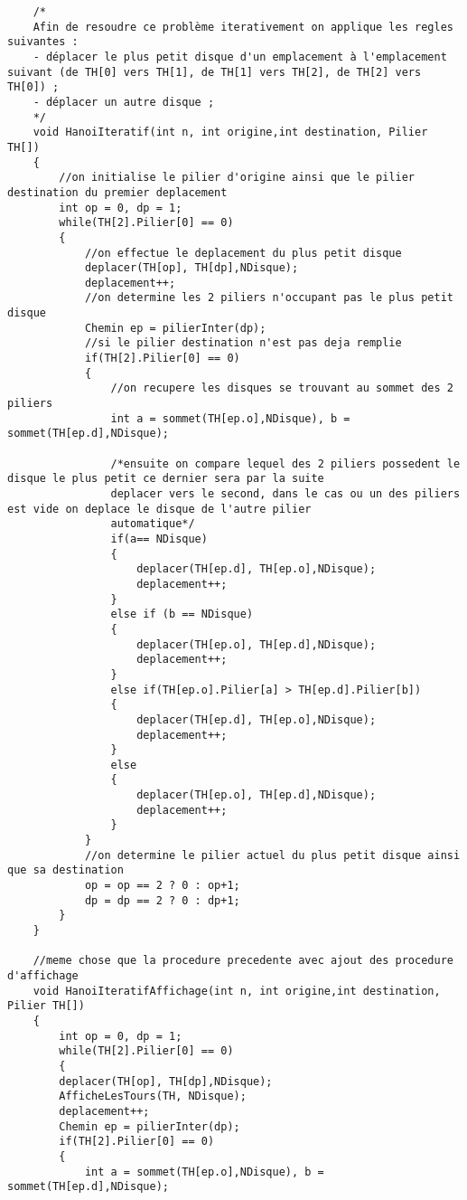 \begin{verbatim}
    /*
    Afin de resoudre ce problème iterativement on applique les regles suivantes :
    - déplacer le plus petit disque d'un emplacement à l'emplacement suivant (de TH[0] vers TH[1], de TH[1] vers TH[2], de TH[2] vers TH[0]) ;
    - déplacer un autre disque ;
    */
    void HanoiIteratif(int n, int origine,int destination, Pilier TH[])
    { 
        //on initialise le pilier d'origine ainsi que le pilier destination du premier deplacement
        int op = 0, dp = 1;
        while(TH[2].Pilier[0] == 0)
        {
            //on effectue le deplacement du plus petit disque
            deplacer(TH[op], TH[dp],NDisque);
            deplacement++;
            //on determine les 2 piliers n'occupant pas le plus petit disque 
            Chemin ep = pilierInter(dp);
            //si le pilier destination n'est pas deja remplie 
            if(TH[2].Pilier[0] == 0)
            {
                //on recupere les disques se trouvant au sommet des 2 piliers 
                int a = sommet(TH[ep.o],NDisque), b = sommet(TH[ep.d],NDisque);
    
                /*ensuite on compare lequel des 2 piliers possedent le disque le plus petit ce dernier sera par la suite
                deplacer vers le second, dans le cas ou un des piliers est vide on deplace le disque de l'autre pilier
                automatique*/
                if(a== NDisque)
                {
                    deplacer(TH[ep.d], TH[ep.o],NDisque);
                    deplacement++;
                }
                else if (b == NDisque)
                {
                    deplacer(TH[ep.o], TH[ep.d],NDisque);
                    deplacement++;
                }
                else if(TH[ep.o].Pilier[a] > TH[ep.d].Pilier[b])
                {
                    deplacer(TH[ep.d], TH[ep.o],NDisque);
                    deplacement++;
                }
                else
                {
                    deplacer(TH[ep.o], TH[ep.d],NDisque);
                    deplacement++;
                }
            }
            //on determine le pilier actuel du plus petit disque ainsi que sa destination
            op = op == 2 ? 0 : op+1; 
            dp = dp == 2 ? 0 : dp+1;
        }
    }
    
    //meme chose que la procedure precedente avec ajout des procedure d'affichage
    void HanoiIteratifAffichage(int n, int origine,int destination, Pilier TH[])
    { 
        int op = 0, dp = 1;
        while(TH[2].Pilier[0] == 0)
        {
        deplacer(TH[op], TH[dp],NDisque);
        AfficheLesTours(TH, NDisque);
        deplacement++;
        Chemin ep = pilierInter(dp);
        if(TH[2].Pilier[0] == 0)
        {
            int a = sommet(TH[ep.o],NDisque), b = sommet(TH[ep.d],NDisque);
    

\end{verbatim}
